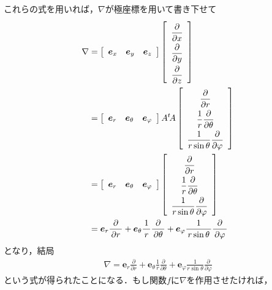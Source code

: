 これらの式を用いれば，$\nabla$が極座標を用いて書き下せて
\begin{align*}
\nabla & = \left[
\renewcommand{\arraystretch}{1}
\begin{array}{ccc}
\bm{e}_x & \bm{e}_y & \bm{e}_z 
\end{array}
\right] \left[
\renewcommand{\arraystretch}{2}
\begin{array}{c}
\dfrac{ \partial } {\partial x} \\
\dfrac{ \partial } {\partial y} \\
\dfrac{ \partial } {\partial z}
\end{array}
\right] \\
& = \left[
\renewcommand{\arraystretch}{1}
\begin{array}{ccc}
\bm{e}_r & \bm{e}_\theta & \bm{e}_\varphi 
\end{array}
\right] A  {}^t \! A 
\left[
\renewcommand{\arraystretch}{2}
\begin{array}{c}
\dfrac{ \partial } {\partial r} \\
\dfrac{1}{r} \dfrac{ \partial } {\partial \theta} \\
\dfrac{1}{r \sin \theta } \dfrac{ \partial } {\partial \varphi}
\end{array}
\right] \\
& = \left[
\renewcommand{\arraystretch}{1}
\begin{array}{ccc}
\bm{e}_r & \bm{e}_\theta & \bm{e}_\varphi 
\end{array}
\right] \left[
\renewcommand{\arraystretch}{2}
\begin{array}{c}
\dfrac{ \partial } {\partial r} \\
\dfrac{1}{r} \dfrac{ \partial } {\partial \theta} \\
\dfrac{1}{r \sin \theta } \dfrac{ \partial } {\partial \varphi}
\end{array}
\right] \\
& = \bm{e}_r \frac{ \partial } {\partial r} 
+ \bm{e}_{\theta} \frac{1}{r} \frac{ \partial } {\partial \theta}
+ \bm{e}_{\varphi} \frac{1}{r \sin \theta } \frac{ \partial } {\partial \varphi}
\end{align*}
となり，結局
\begin{align}
\nabla = \bm{e}_r \frac{ \partial } {\partial r} 
+ \bm{e}_{\theta} \frac{1}{r} \frac{ \partial } {\partial \theta}
+ \bm{e}_{\varphi} \frac{1}{r \sin \theta } \frac{ \partial } {\partial \varphi}
\label{eq:nablakyoku}
\end{align}
という式が得られたことになる．もし関数$f$に$\nabla$を作用させたければ，
